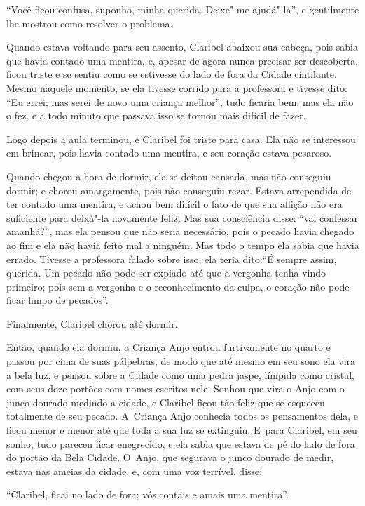 ``Você ficou confusa, suponho, minha querida. Deixe"-me ajudá"-la'', e
gentilmente lhe mostrou como resolver o problema.

Quando estava voltando para seu assento, Claribel abaixou sua cabeça,
pois sabia que havia contado uma mentira, e, apesar de agora nunca
precisar ser descoberta, ficou triste e se sentiu como se estivesse do
lado de fora da Cidade cintilante. Mesmo naquele momento, se ela tivesse
corrido para a professora e tivesse dito: ``Eu errei; mas serei de novo
uma criança melhor'', tudo ficaria bem; mas ela não o fez, e a todo
minuto que passava isso se tornou mais difícil de fazer.

Logo depois a aula terminou, e Claribel foi triste para casa. Ela não se
interessou em brincar, pois havia contado uma mentira, e seu coração
estava pesaroso.

Quando chegou a hora de dormir, ela se deitou cansada, mas não conseguiu
dormir; e chorou amargamente, pois não conseguiu rezar. Estava
arrependida de ter contado uma mentira, e achou bem difícil o fato de que
sua aflição não era suficiente para deixá"-la novamente feliz. Mas sua
consciência disse: ``vai confessar amanhã?'', mas ela pensou que não
seria necessário, pois o pecado havia chegado ao fim e ela não havia
feito mal a ninguém. Mas todo o tempo ela sabia que havia errado.
Tivesse a professora falado sobre isso, ela teria dito:``É sempre assim,
querida. Um pecado não pode ser expiado até que a vergonha tenha vindo
primeiro; pois sem a vergonha e o reconhecimento da culpa, o coração não
pode ficar limpo de pecados''.

Finalmente, Claribel chorou até dormir.

Então, quando ela dormiu, a Criança Anjo entrou furtivamente no quarto e
passou por cima de suas pálpebras, de modo que até mesmo em seu sono ela
vira a bela luz, e pensou sobre a Cidade como uma pedra jaspe, límpida
como cristal, com seus doze portões com nomes escritos nele. Sonhou que
vira o Anjo com o junco dourado medindo a cidade, e Claribel ficou tão
feliz que se esqueceu totalmente de seu pecado. A~Criança Anjo conhecia
todos os pensamentos dela, e ficou menor e menor até que toda a sua luz
se extinguiu. E~para Claribel, em seu sonho, tudo pareceu ficar
enegrecido, e ela sabia que estava de pé do lado de fora do portão da
Bela Cidade. O~Anjo, que segurava o junco dourado de medir, estava nas
ameias da cidade, e, com uma voz terrível, disse:

``Claribel, ficai no lado de fora; vós contais e amais uma mentira''.

